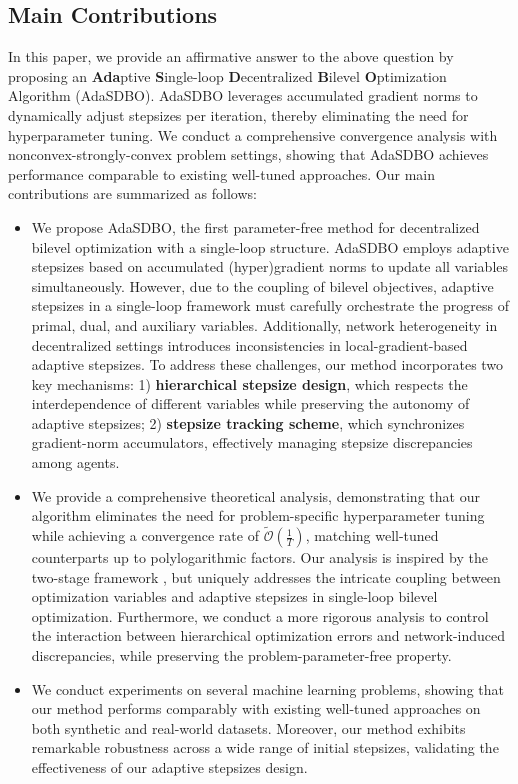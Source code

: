 \documentclass{article}
\theoremstyle{plain}
\theoremstyle{definition}
\theoremstyle{remark}
\def\w#1{\widetilde{#1}}
\begin{document}
\subsection{Main Contributions}
\vspace{-0.2cm}
In this paper, we provide an affirmative answer to the above question by proposing an {\bf Ada}ptive {\bf S}ingle-loop {\bf D}ecentralized {\bf B}ilevel {\bf O}ptimization Algorithm (AdaSDBO). AdaSDBO leverages accumulated gradient norms to dynamically adjust stepsizes per iteration, thereby eliminating the need for hyperparameter tuning. 
We conduct a comprehensive convergence analysis with nonconvex-strongly-convex problem settings, showing that AdaSDBO achieves performance comparable to existing well-tuned approaches. 
Our main contributions are summarized as follows:
\begin{itemize}[topsep=0pt, itemsep=2pt, parsep=0pt, leftmargin=0.25cm]
    \item We propose AdaSDBO, the first parameter-free method for decentralized bilevel optimization with a single-loop structure. AdaSDBO employs adaptive stepsizes based on accumulated (hyper)gradient norms to update all variables simultaneously. However, due to the coupling of bilevel objectives, adaptive stepsizes in a single-loop framework must carefully orchestrate the progress of primal, dual, and auxiliary variables. Additionally, network heterogeneity in decentralized settings introduces inconsistencies in local-gradient-based adaptive stepsizes. To address these challenges, our method incorporates two key mechanisms: 1) \textbf{hierarchical stepsize design}, which respects the interdependence of different variables while preserving the autonomy of adaptive stepsizes; 2) \textbf{stepsize tracking scheme}, which synchronizes gradient-norm accumulators, effectively managing stepsize discrepancies among agents.
    \item We provide a comprehensive theoretical analysis, demonstrating that our algorithm eliminates the need for problem-specific hyperparameter tuning while achieving a convergence rate of \(\w{\mathcal{O}}\left(\frac{1}{T}\right)\), matching well-tuned counterparts \citep{ji2022will, dong2023single} up to polylogarithmic factors. Our analysis is inspired by the two-stage framework \citep{xie2020linear, ward2020adagrad}, but uniquely addresses the intricate coupling between optimization variables and adaptive stepsizes in single-loop bilevel optimization. Furthermore, we conduct a more rigorous analysis to control the interaction between hierarchical optimization errors and network-induced discrepancies, while preserving the problem-parameter-free property.
    \item We conduct experiments on several machine learning problems, showing that our method performs comparably with existing well-tuned approaches on both synthetic and real-world datasets. Moreover, our method exhibits remarkable robustness across a wide range of initial stepsizes, validating the effectiveness of our adaptive stepsizes design.
\end{itemize}  
\end{document}
